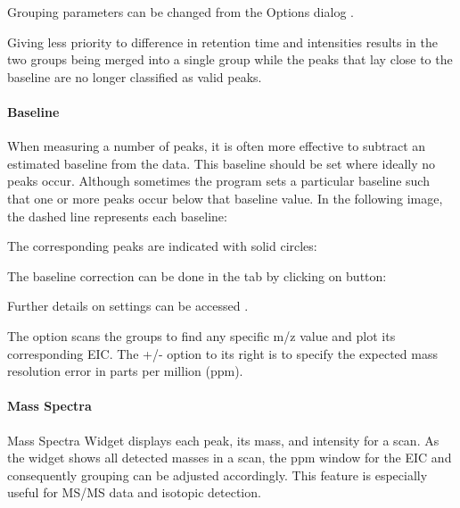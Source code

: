 \documentclass[letterpaper,10pt,english,openany,oneside]{sphinxmanual}
\begin{document}
Grouping parameters can be changed from the Options dialog .



Giving less priority to difference in retention time and intensities results in the two groups being merged into a single  group while the peaks that lay close to the baseline are no longer classified as valid peaks.


\paragraph{Baseline}
\label{\detokenize{UnlabeledLCMSWorkflow:baseline}}
When measuring a number of peaks, it is often more effective to subtract an estimated baseline from the data. This baseline should be set where ideally no peaks occur. Although sometimes the program sets a particular baseline such that one or more peaks occur below that baseline value. In the following image, the dashed line represents each baseline:


The corresponding peaks are indicated with solid circles:


The baseline correction can be done in the  tab by clicking on  button:


Further details on settings can be accessed .

The  option scans the groups to find any specific m/z value and plot its corresponding EIC. The +/- option to its right is to specify the expected mass resolution error in parts per million (ppm).



\paragraph{Mass Spectra}
\label{\detokenize{UnlabeledLCMSWorkflow:mass-spectra}}
Mass Spectra Widget  displays each peak, its mass, and intensity for a scan. As the widget shows all detected masses in a scan, the ppm window for the EIC and consequently grouping can be adjusted accordingly. This feature is especially useful for MS/MS data and isotopic detection.
\end{document}
